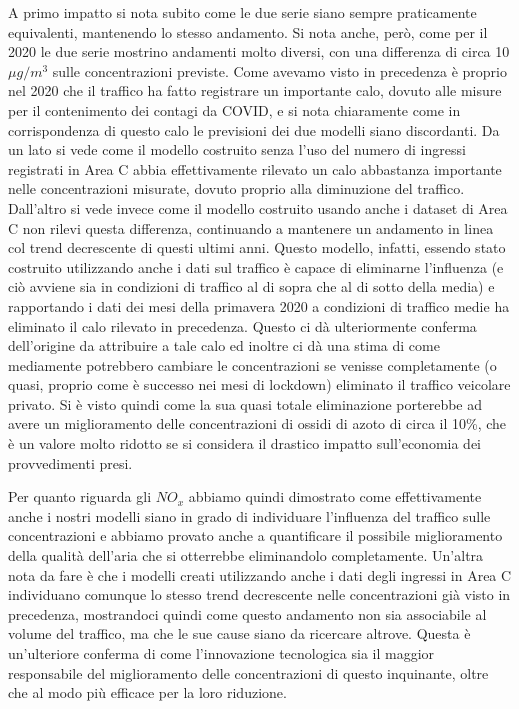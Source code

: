 \documentclass[a4paper]{report}
\begin{document}
A primo impatto si nota subito come le due serie siano sempre praticamente equivalenti, mantenendo lo stesso andamento. Si nota anche, però, come per il 2020 le due serie mostrino andamenti molto diversi, con una differenza di circa 10 $\mu g/m^3$ sulle concentrazioni previste.
Come avevamo visto in precedenza è proprio nel 2020 che il traffico ha fatto registrare un importante calo, dovuto alle misure per il contenimento dei contagi da COVID, e si nota chiaramente come in corrispondenza di questo calo le previsioni dei due modelli siano discordanti.
Da un lato si vede come il modello costruito senza l'uso del numero di ingressi registrati in Area C abbia effettivamente rilevato un calo abbastanza importante nelle concentrazioni misurate, dovuto proprio alla diminuzione del traffico. Dall'altro si vede invece come il modello costruito usando anche i dataset di Area C non rilevi questa differenza, continuando a mantenere un andamento in linea col trend decrescente di questi ultimi anni. Questo modello, infatti, essendo stato costruito utilizzando anche i dati sul traffico è capace di eliminarne l'influenza (e ciò avviene sia in condizioni di traffico al di sopra che al di sotto della media) e rapportando i dati dei mesi della primavera 2020 a condizioni di traffico medie ha eliminato il calo rilevato in precedenza. Questo ci dà ulteriormente conferma dell'origine da attribuire a tale calo ed inoltre ci dà una stima di come mediamente potrebbero cambiare le concentrazioni se venisse completamente (o quasi, proprio come è successo nei mesi di lockdown) eliminato il traffico veicolare privato. Si è visto quindi come la sua quasi totale eliminazione porterebbe ad avere un miglioramento delle concentrazioni di ossidi di azoto di circa il 10\%, che è un valore molto ridotto se si considera il drastico impatto sull'economia dei provvedimenti presi.

Per quanto riguarda gli $NO_x$ abbiamo quindi dimostrato come effettivamente anche i nostri modelli siano in grado di individuare l'influenza del traffico sulle concentrazioni e abbiamo provato anche a quantificare il possibile miglioramento della qualità dell'aria che si otterrebbe eliminandolo completamente.
Un'altra nota da fare è che i modelli creati utilizzando anche i dati degli ingressi in Area C individuano comunque lo stesso trend decrescente nelle concentrazioni già visto in precedenza, mostrandoci quindi come questo andamento non sia associabile al volume del traffico, ma che le sue cause siano da ricercare altrove. Questa è un'ulteriore conferma di come l'innovazione tecnologica sia il maggior responsabile del miglioramento delle concentrazioni di questo inquinante, oltre che al modo più efficace per la loro riduzione.
\end{document}
